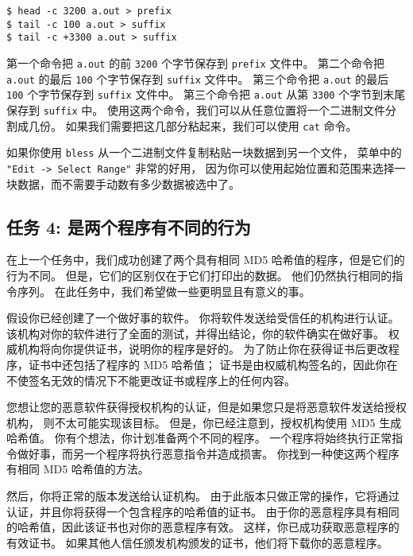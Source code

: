 \begin{lstlisting}
$ head -c 3200 a.out > prefix
$ tail -c 100 a.out > suffix
$ tail -c +3300 a.out > suffix
\end{lstlisting}

第一个命令把 \texttt{a.out} 的前 \texttt{3200} 个字节保存到 \texttt{prefix} 文件中。
第二个命令把 \texttt{a.out} 的最后 \texttt{100} 个字节保存到 \texttt{suffix} 文件中。
第三个命令把 \texttt{a.out} 的最后 \texttt{100} 个字节保存到 \texttt{suffix} 文件中。
第三个命令把 \texttt{a.out} 从第 \texttt{3300} 个字节到末尾保存到 \texttt{suffix} 中。
使用这两个命令，我们可以从任意位置将一个二进制文件分割成几份。
如果我们需要把这几部分粘起来，我们可以使用 \texttt{cat} 命令。


如果你使用 \texttt{bless} 从一个二进制文件复制粘贴一块数据到另一个文件，
菜单中的 \texttt{"Edit -> Select Range"} 非常的好用，
因为你可以使用起始位置和范围来选择一块数据，而不需要手动数有多少数据被选中了。




\subsection{任务 4: 是两个程序有不同的行为}


在上一个任务中，我们成功创建了两个具有相同 MD5 哈希值的程序，但是它们的行为不同。
但是，它们的区别仅在于它们打印出的数据。
他们仍然执行相同的指令序列。
在此任务中，我们希望做一些更明显且有意义的事。

假设你已经创建了一个做好事的软件。
你将软件发送给受信任的机构进行认证。
该机构对你的软件进行了全面的测试，并得出结论，你的软件确实在做好事。
权威机构将向你提供证书，说明你的程序是好的。
为了防止你在获得证书后更改程序，证书中还包括了程序的 MD5 哈希值；
证书是由权威机构签名的，因此你在不使签名无效的情况下不能更改证书或程序上的任何内容。


您想让您的恶意软件获得授权机构的认证，但是如果您只是将恶意软件发送给授权机构，
则不太可能实现该目标。
但是，你已经注意到，授权机构使用 MD5 生成哈希值。
你有个想法，你计划准备两个不同的程序。
一个程序将始终执行正常指令做好事，而另一个程序将执行恶意指令并造成损害。
你找到一种使这两个程序有相同 MD5 哈希值的方法。

然后，你将正常的版本发送给认证机构。
由于此版本只做正常的操作，它将通过认证，并且你将获得一个包含程序的哈希值的证书。
由于你的恶意程序具有相同的哈希值，因此该证书也对你的恶意程序有效。
这样，你已成功获取恶意程序的有效证书。
如果其他人信任颁发机构颁发的证书，他们将下载你的恶意程序。

